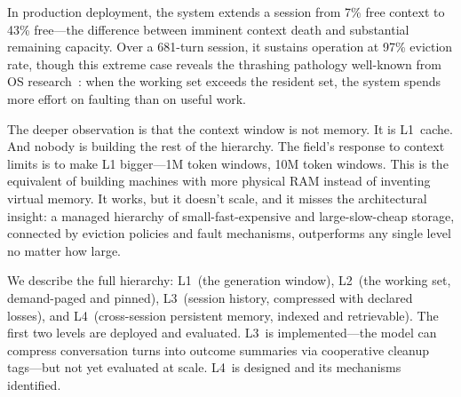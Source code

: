 In production deployment, the system extends a session from 7\%
free context to 43\% free---the difference between imminent context
death and substantial remaining capacity. Over a 681-turn session,
it sustains operation at 97\% eviction rate, though this extreme
case reveals the thrashing pathology well-known from OS
research~\citep{denning1968working}: when the working set exceeds
the resident set, the system spends more effort on faulting than on
useful work.

The deeper observation is that the context window is not memory. It
is L1~cache. And nobody is building the rest of the hierarchy.
The field's response to context limits is to make L1 bigger---1M
token windows, 10M token windows. This is the equivalent of building
machines with more physical RAM instead of inventing virtual memory.
It works, but it doesn't scale, and it misses the architectural
insight: a managed hierarchy of small-fast-expensive and
large-slow-cheap storage, connected by eviction policies and fault
mechanisms, outperforms any single level no matter how large.

We describe the full hierarchy: L1~(the generation window), L2~(the
working set, demand-paged and pinned), L3~(session history,
compressed with declared losses), and L4~(cross-session persistent
memory, indexed and retrievable). The first two levels are deployed
and evaluated. L3~is implemented---the model can compress conversation
turns into outcome summaries via cooperative cleanup tags---but not
yet evaluated at scale. L4~is designed and its mechanisms identified.


